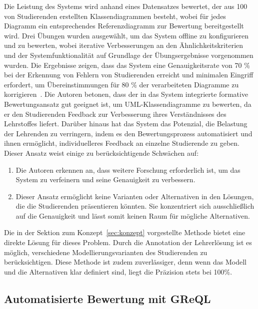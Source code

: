 Die Leistung des Systems wird anhand eines Datensatzes bewertet, der aus 100 von Studierenden erstellten
Klassendiagrammen besteht, wobei für jedes Diagramm ein entsprechendes Referenzdiagramm zur Bewertung bereitgestellt
wird. Drei Übungen wurden ausgewählt, um das System offline zu konfigurieren und zu bewerten, wobei iterative
Verbesserungen an den Ähnlichkeitskriterien und der Systemfunktionalität auf Grundlage der Übungsergebnisse vorgenommen
wurden. Die Ergebnisse zeigen, dass das System eine Genauigkeitsrate von 70 \% bei der Erkennung von Fehlern von
Studierenden erreicht und minimalen Eingriff erfordert, um Übereinstimmungen für 80 \% der verarbeiteten Diagramme zu
korrigieren~\cite{anas2021new}. Die Autoren betonen, dass der in das System integrierte formative Bewertungsansatz gut
geeignet ist, um UML-Klassendiagramme zu bewerten, da er den Studierenden Feedback zur Verbesserung ihres Verständnisses
des Lehrstoffes liefert. Darüber hinaus hat das System das Potenzial, die Belastung der Lehrenden zu verringern, indem
es den Bewertungsprozess automatisiert und ihnen ermöglicht, individuelleres Feedback an einzelne Studierende zu geben.
Dieser Ansatz weist einige zu berücksichtigende Schwächen auf:

\begin{enumerate}
    \item Die Autoren erkennen an, dass weitere Forschung erforderlich ist, um das System zu verfeinern und seine Genauigkeit zu
    verbessern.
    \item Dieser Ansatz ermöglicht keine Varianten oder Alternativen in den Lösungen, die die Studierenden präsentieren
    könnten. Sie konzentriert sich ausschließlich auf die Genauigkeit und lässt somit keinen Raum für mögliche
    Alternativen.
\end{enumerate}

Die in der Sektion zum Konzept~\ref{sec:konzept} vorgestellte Methode bietet eine direkte Lösung für dieses Problem.
Durch die Annotation der Lehrerlösung ist es möglich, verschiedene Modellierungsvarianten des Studierenden zu
berücksichtigen. Diese Methode ist zudem zuverlässiger, denn wenn das Modell und die Alternativen klar definiert sind,
liegt die Präzision stets bei 100\%.


\subsection{Automatisierte Bewertung mit GReQL}\label{subsec:automatisierte-bewertung-mit-greql}

